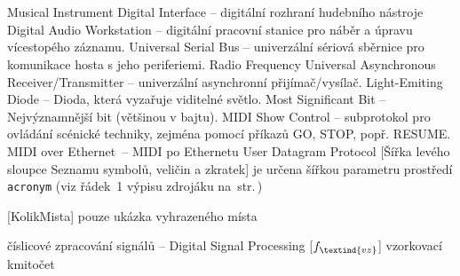 \cleardoublepage
\chapter*{\listofabbrevname}
{}

\begin{acronym}[KolikMista]
        {Musical Instrument Digital Interface -- digitální rozhraní hudebního nástroje}
        {Digital Audio Workstation -- digitální pracovní stanice pro náběr a úpravu vícestopého záznamu.}
        {Universal Serial Bus -- univerzální sériová sběrnice pro komunikace hosta s jeho periferiemi.}
        {Radio Frequency}
        {Universal Asynchronous Receiver/Transmitter -- univerzální asynchronní přijímač/vysílač.}
        {Light-Emiting Diode -- Dioda, která vyzařuje viditelné světlo.}
        {Most Significant Bit -- Nejvýznamnější bit (většinou v bajtu).}
        {\acs{MIDI} Show Control -- subprotokol pro ovládání scénické techniky, zejména pomocí příkazů GO, STOP, popř. RESUME.}
        {\acs{MIDI} over Ethernet~-- \acs{MIDI} po Ethernetu}
        {User Datagram Protocol}
		[Šířka levého sloupce Seznamu symbolů, veličin a zkratek]								%
		{je určena šířkou parametru prostředí \texttt{acronym} (viz řádek~1 výpisu zdrojáku na~str.\,\pageref{lst:zkratky})}

		[KolikMista]
		{pouze ukázka vyhrazeného místa}

		{číslicové zpracování signálů -- Digital Signal Processing}
		[\ensuremath{f_\textind{vz}}] %
		{vzorkovací kmitočet}					%

\end{acronym}
